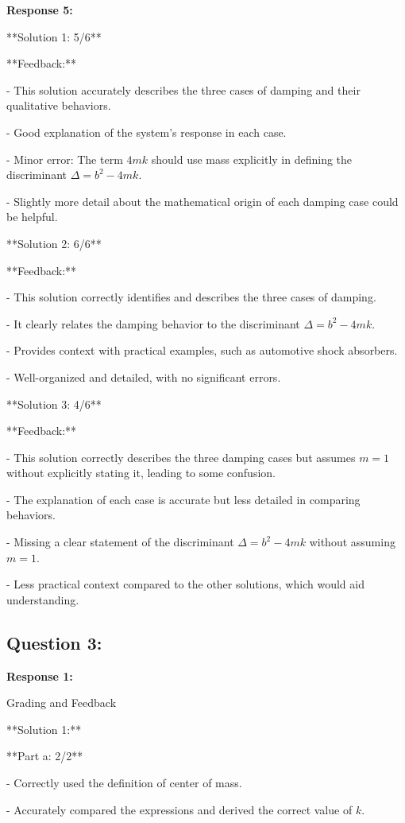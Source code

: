 \documentclass[a4paper,11pt]{article}
\begin{document}
\bigskip
\textbf{Response 5:}

**Solution 1: 5/6**

**Feedback:**

- This solution accurately describes the three cases of damping and their qualitative behaviors.

- Good explanation of the system's response in each case.

- Minor error: The term \(4mk\) should use mass explicitly in defining the discriminant \(\Delta = b^2 - 4mk\).

- Slightly more detail about the mathematical origin of each damping case could be helpful.

**Solution 2: 6/6**

**Feedback:**

- This solution correctly identifies and describes the three cases of damping.

- It clearly relates the damping behavior to the discriminant \(\Delta = b^2 - 4mk\).

- Provides context with practical examples, such as automotive shock absorbers.

- Well-organized and detailed, with no significant errors.

**Solution 3: 4/6**

**Feedback:**

- This solution correctly describes the three damping cases but assumes \(m=1\) without explicitly stating it, leading to some confusion.

- The explanation of each case is accurate but less detailed in comparing behaviors.

- Missing a clear statement of the discriminant \(\Delta = b^2 - 4mk\) without assuming \(m=1\).

- Less practical context compared to the other solutions, which would aid understanding.

\subsection*{Question 3:}

\textbf{Response 1:}

Grading and Feedback

**Solution 1:**

**Part a: 2/2**

- Correctly used the definition of center of mass.

- Accurately compared the expressions and derived the correct value of \( k \).
\end{document}
